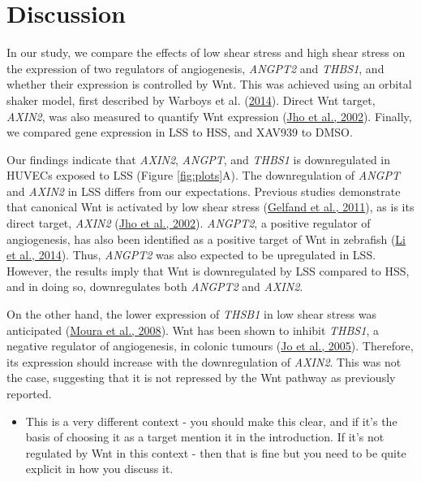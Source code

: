 \documentclass[
  11pt,
]{article}
\providecommand{\tightlist}{%
  \setlength{\itemsep}{0pt}\setlength{\parskip}{0pt}}
\begin{document}
\hypertarget{discussion}{%
\section{Discussion}\label{discussion}}

In our study, we compare the effects of low shear stress and high shear stress on the expression of two regulators of angiogenesis, \emph{ANGPT2} and \emph{THBS1}, and whether their expression is controlled by Wnt.
This was achieved using an orbital shaker model, first described by Warboys et al. (\protect\hyperlink{ref-Warboys2014}{2014}).
Direct Wnt target, \emph{AXIN2}, was also measured to quantify Wnt expression (\protect\hyperlink{ref-Jho2002}{Jho et al., 2002}).
Finally, we compared gene expression in LSS to HSS, and XAV939 to DMSO.

Our findings indicate that \emph{AXIN2}, \emph{ANGPT}, and \emph{THBS1} is downregulated in HUVECs exposed to LSS (Figure \ref{fig:plots}A).
The downregulation of \emph{ANGPT} and \emph{AXIN2} in LSS differs from our expectations.
Previous studies demonstrate that canonical Wnt is activated by low shear stress (\protect\hyperlink{ref-Gelfand2011}{Gelfand et al., 2011}), as is its direct target, \emph{AXIN2} (\protect\hyperlink{ref-Jho2002}{Jho et al., 2002}).
\emph{ANGPT2}, a positive regulator of angiogenesis, has also been identified as a positive target of Wnt in zebrafish (\protect\hyperlink{ref-Li2014-mx}{Li et al., 2014}).
Thus, \emph{ANGPT2} was also expected to be upregulated in LSS.
However, the results imply that Wnt is downregulated by LSS compared to HSS, and in doing so, downregulates both \emph{ANGPT2} and \emph{AXIN2}.

On the other hand, the lower expression of \emph{THSB1} in low shear stress was anticipated (\protect\hyperlink{ref-Moura2008}{Moura et al., 2008}).
Wnt has been shown to inhibit \emph{THBS1}, a negative regulator of angiogenesis, in colonic tumours (\protect\hyperlink{ref-jo2005}{Jo et al., 2005}).
Therefore, its expression should increase with the downregulation of \emph{AXIN2}.
This was not the case, suggesting that it is not repressed by the Wnt pathway as previously reported.

\color{red}

\begin{itemize}
\tightlist
\item
  This is a very different context - you should make this clear, and if it's the basis of choosing it as a target mention it in the introduction. If it's not regulated by Wnt in this context - then that is fine but you need to be quite explicit in how you discuss it.
\end{itemize}
\end{document}
